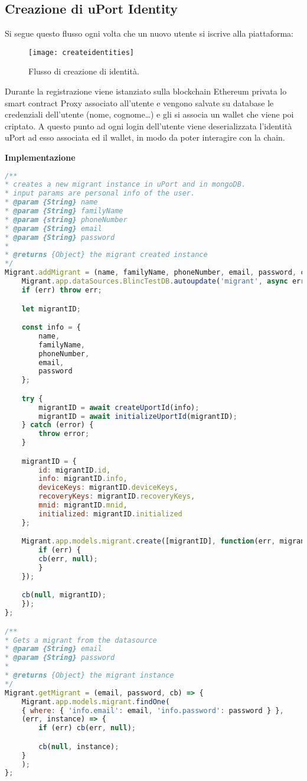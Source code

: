 \subsection{Creazione di uPort Identity}

Si segue questo flusso ogni volta che un nuovo utente si iscrive alla piattaforma:

\begin{figure}[!ht]
    \texttt{[image: createidentities]}
    \caption{Flusso di creazione di identità.}
    \label{fig:createidentities}
  \end{figure}

Durante la registrazione viene istanziato sulla blockchain Ethereum privata 
lo smart contract Proxy associato all’utente e vengono salvate su database le credenziali
dell’utente (nome, cognome…) e gli si associa un wallet che viene poi criptato. A questo punto
ad ogni login dell’utente viene deserializzata l’identità uPort
ad esso associata ed il wallet, in modo da poter interagire con la chain.

\textbf{Implementazione}

\begin{lstlisting}[language=JavaScript]
/**
* creates a new migrant instance in uPort and in mongoDB.
* input params are personal info of the user.
* @param {String} name
* @param {String} familyName
* @param {string} phoneNumber
* @param {String} email
* @param {String} password
*
* @returns {Object} the migrant created instance
*/
Migrant.addMigrant = (name, familyName, phoneNumber, email, password, cb) => {
    Migrant.app.dataSources.BlincTestDB.autoupdate('migrant', async err => {
    if (err) throw err;

    let migrantID;

    const info = {
        name,
        familyName,
        phoneNumber,
        email,
        password
    };

    try {
        migrantID = await createUportId(info);
        migrantID = await initializeUportId(migrantID);
    } catch (error) {
        throw error;
    }

    migrantID = {
        id: migrantID.id,
        info: migrantID.info,
        deviceKeys: migrantID.deviceKeys,
        recoveryKeys: migrantID.recoveryKeys,
        mnid: migrantID.mnid,
        initialized: migrantID.initialized
    };

    Migrant.app.models.migrant.create([migrantID], function(err, migrant) {
        if (err) {
        cb(err, null);
        }
    });

    cb(null, migrantID);
    });
};

/**
* Gets a migrant from the datasource
* @param {String} email
* @param {String} password
*
* @returns {Object} the migrant instance
*/
Migrant.getMigrant = (email, password, cb) => {
    Migrant.app.models.migrant.findOne(
    { where: { 'info.email': email, 'info.password': password } },
    (err, instance) => {
        if (err) cb(err, null);

        cb(null, instance);
    }
    );
};
\end{lstlisting}

